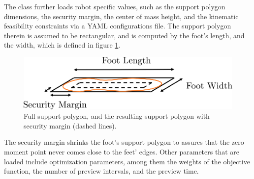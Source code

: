 The  class further loads robot specific values, such as the support polygon dimensions, the security margin, the center of mass height, and the kinematic feasibility constraints via a YAML \cite{ben2005yaml} configurations file. The support polygon therein is assumed to be rectangular, and is computed by the foot's length, and the width, which is defined in figure \ref{fig::62_support_polygon}. 
\begin{figure}[h!]
	\centering
	\includegraphics[scale=.5]{chapters/02_foundations_for_humanoid_walking/img/support_polygon.png}
	\caption{Full support polygon, and the resulting support polygon with security margin (dashed lines).}
	\label{fig::62_support_polygon}
\end{figure}
The security margin shrinks the foot's support polygon to assures that the zero moment point never comes close to the feet' edges. Other parameters that are loaded include optimization parameters, among them the weights of the objective function, the number of preview intervals, and the preview time.
\FloatBarrier
